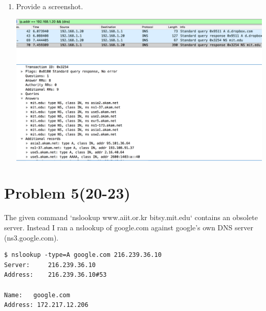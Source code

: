 \documentclass[letter,10pt]{article}
\begin{document}
\begin{enumerate}
\begin{verbatim}
\end{verbatim}

\item Provide a screenshot.

\includegraphics[width=\textwidth]{./figures/hw6_screenshot_19.png}

\end{enumerate}

\section{Problem 5(20-23)}

The given command `nslookup www.aiit.or.kr bitsy.mit.edu` contains an obsolete server. Instead I ran a nslookup of google.com against google's own DNS server (ns3.google.com).

\begin{verbatim}
$ nslookup -type=A google.com 216.239.36.10
Server:		216.239.36.10
Address:	216.239.36.10#53

Name:	google.com
Address: 172.217.12.206
\end{verbatim}
\end{document}

